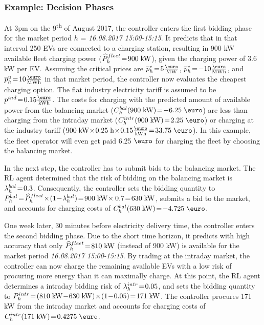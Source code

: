 \documentclass[a4paper, 12pt]{article}
\begin{document}
\subsubsection{Example: Decision Phases}
\label{sec:org5cb6418}
At 3pm on the 9\textsuperscript{th} of August 2017, the controller enters the first bidding
phase for the market period \(h\) = \emph{16.08.2017 15:00-15:15}. It predicts that in
that interval 250 EVs are connected to a charging station, resulting in 900 kW
available fleet charging power (\(\widehat{P}^{fleet}_{h}\!=\!900\;\text{kW}\)), given the charging
power of 3.6 kW per EV. Assuming the critical prices are \(\ccp{h}\!=\!5\emw\),
\(\cep{h}\!=\!-10\emwh\), and \(\cup{h}\!=\!10\emwh\) in that market period, the
controller now evaluates the cheapest charging option. The flat industry
electricity tariff is assumed to be \(p^{ind}\!=\!0.15\ekwh\). The costs for
charging with the predicted amount of available power from the balancing market
(\(\Cb{h}(900\;\kw)\!=\!-6.25\;\eur\)) are less than charging from the intraday
market (\(\Ci{h}(900\;\kw)\!=\!2.25\;\eur\)) or charging at the industry tariff
(\(900\;\kw\!\times\!0.25\;\text{h}\!\times\!0.15\ekwh\!=\!33.75\;\eur\)). In this
example, the fleet operator will even get paid 6.25 \(\eur\) for charging the
fleet by choosing the balancing market.

In the next step, the controller has to submit bids to the balancing market. The
RL agent determined that the risk of bidding on the balancing market is
\(\lambda^{bal}_{h}\!=\!0.3\). Consequently, the controller sets the bidding quantity to
\(\Pb{h}\!=\!\fPhat{h}\!\times\!(1\!-\!\lb{h})\!=\!900\;\kw\!\times0.7\!=\!630\;\kw\),
submits a bid to the market, and accounts for charging costs of
\(\Cb{h}(630\;\kw)\!=\!-4.725\;\eur\).

One week later, 30 minutes before electricity delivery time, the controller
enters the second bidding phase. Due to the short time horizon, it predicts with
high accuracy that only \(\widehat{P}^{fleet}_{h}\!=\!810\;\text{kW}\) (instead of 900 kW) is
available for the market period \emph{16.08.2017 15:00-15:15}. By trading at the
intraday market, the controller can now charge the remaining available EVs with
a low risk of procuring more energy than it can maximally charge. At this point,
the RL agent determines a intraday bidding risk of \(\lambda^{intr}_{h}\!=\!0.05\), and sets
the bidding quantity to
\(\Pi{h}\!=\!(810\;\kw\!-\!630\;\kw)\!\times\!(1\!-\!0.05)\!=\!171\;\kw\). The
controller procures 171 kW from the intraday market and accounts for charging
costs of \(\Ci{h}(171\;\kw)\!=\!0.4275\;\eur\).
\end{document}
